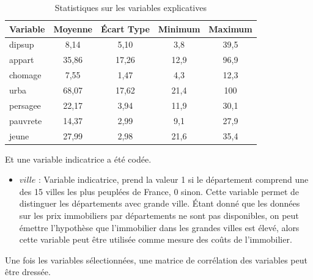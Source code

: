 \documentclass{article}
\begin{document}
\begin{table}[H]
    \centering
    \caption{Statistiques sur les variables explicatives}
    \begin{tabular}{l*{1}{|cccc}}
                \toprule
                Variable    &    Moyenne &Écart Type& Minimum&     Maximum\\
                \midrule
                dipsup      &    8,14&    5,10&         3,8&        39,5\\
                appart      &    35,86&    17,26&        12,9&        96,9\\
                chomage     &    7,55&    1,47&         4,3&        12,3\\
                urba        &    68,07&    17,62&        21,4&         100\\
                persagee    &    22,17&    3,94&        11,9&        30,1\\
                pauvrete    &    14,37&    2,99&         9,1&        27,9\\
                jeune       &    27,99&    2,98&        21,6&        35,4\\
                \bottomrule
    \end{tabular}
\end{table}
Et une variable indicatrice a été codée.
\begin{itemize}
    \item $ville$ : Variable indicatrice, prend la valeur 1 si le département comprend une des 15 villes les plus peuplées de France, 0 sinon. Cette variable permet de distinguer les
        départements avec grande ville. Étant donné que les données sur les prix immobiliers par départements ne sont pas disponibles, on peut émettre l'hypothèse que l'immobilier dans
        les grandes villes est élevé, alors cette variable peut être utilisée comme mesure des coûts de l'immobilier.
\end{itemize}
Une fois les variables sélectionnées, une matrice de corrélation des variables peut être dressée.
\end{document}
